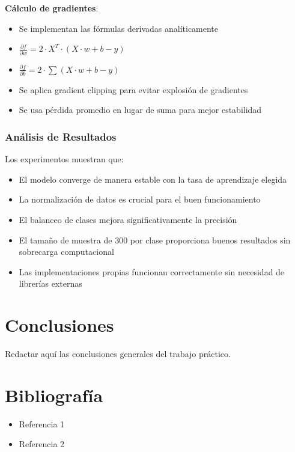 \documentclass[a4paper,12pt]{article}
\begin{document}
\textbf{Cálculo de gradientes}:
\begin{itemize}
    \item Se implementan las fórmulas derivadas analíticamente
    \item $\frac{\partial f}{\partial w} = 2 \cdot X^T \cdot (X \cdot w + b - y)$
    \item $\frac{\partial f}{\partial b} = 2 \cdot \sum(X \cdot w + b - y)$
    \item Se aplica gradient clipping para evitar explosión de gradientes
    \item Se usa pérdida promedio en lugar de suma para mejor estabilidad
\end{itemize}

\subsubsection{Análisis de Resultados}
Los experimentos muestran que:
\begin{itemize}
    \item El modelo converge de manera estable con la tasa de aprendizaje elegida
    \item La normalización de datos es crucial para el buen funcionamiento
    \item El balanceo de clases mejora significativamente la precisión
    \item El tamaño de muestra de 300 por clase proporciona buenos resultados sin sobrecarga computacional
    \item Las implementaciones propias funcionan correctamente sin necesidad de librerías externas
\end{itemize}


\section{Conclusiones}
Redactar aquí las conclusiones generales del trabajo práctico.

\section*{Bibliografía}
\begin{itemize}
    \item Referencia 1
    \item Referencia 2
\end{itemize}
\end{document}
